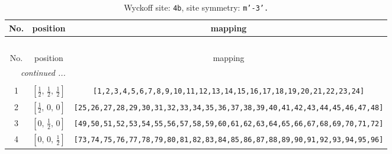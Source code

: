 \documentclass[fleqn,8pt]{jsarticle}
\begin{document}
\begin{longtable}{ccc}
\caption{Wyckoff site: {\tt 4b}, site symmetry: {\tt m'-3'.}}
 \\
 \hline \hline
No. & position & mapping \\ \hline \endfirsthead

\multicolumn{2}{l}{\tablename\ \thetable{}} \\
 \hline \hline
No. & position & mapping \\ \hline \endhead

 \hline \hline
\multicolumn{2}{r}{\footnotesize\it continued ...} \\ \endfoot

 \hline \hline
\multicolumn{2}{r}{} \\ \endlastfoot

1 & $\left[ \frac{1}{2},\, \frac{1}{2},\, \frac{1}{2} \right]$ & {\tt [1,2,3,4,5,6,7,8,9,10,11,12,13,14,15,16,17,18,19,20,21,22,23,24]} \\ \hline
2 & $\left[ \frac{1}{2},\, 0,\, 0 \right]$ & {\tt [25,26,27,28,29,30,31,32,33,34,35,36,37,38,39,40,41,42,43,44,45,46,47,48]} \\ \hline
3 & $\left[ 0,\, \frac{1}{2},\, 0 \right]$ & {\tt [49,50,51,52,53,54,55,56,57,58,59,60,61,62,63,64,65,66,67,68,69,70,71,72]} \\ \hline
4 & $\left[ 0,\, 0,\, \frac{1}{2} \right]$ & {\tt [73,74,75,76,77,78,79,80,81,82,83,84,85,86,87,88,89,90,91,92,93,94,95,96]} \\
\end{longtable}
\renewcommand{\arraystretch}{1.2}
\end{document}
